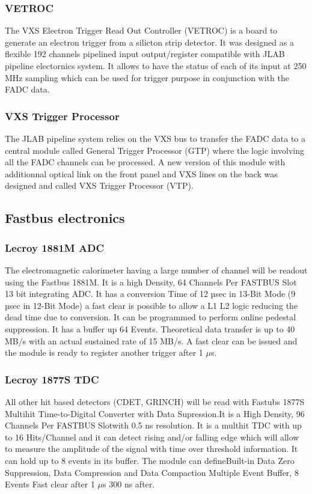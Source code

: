\documentclass{article}
\begin{document}
\subsubsection{VETROC}
The VXS Electron Trigger Read Out Controller (VETROC) is a board to generate an electron trigger from a silicton strip detector. It was designed as a flexible 192 channels pipelined input output/register compatible with JLAB pipeline electornics system. It allows to have the status of each of its input at 250 MHz sampling which can be used for trigger purpose in conjunction with the FADC data.

\subsubsection{VXS Trigger Processor}
The JLAB pipeline system relies on the VXS bus to transfer the FADC data to a central module called General Trigger Processor (GTP) where the logic involving all the FADC channels can be processed. A new version of this module with additionnal optical link on the front panel and VXS lines on the back was designed and called VXS Trigger Processor (VTP).


\subsection{Fastbus electronics}
\subsubsection{Lecroy 1881M ADC}
The electromagnetic calorimeter having a large number of channel will be readout using the Fastbus 1881M.
It is a high Density, 64 Channels Per FASTBUS Slot 13 bit integrating ADC. It has a conversion Time of 12 µsec in 13-Bit Mode (9 µsec in 12-Bit Mode) a fast clear is possible to allow a L1 L2 logic reducing the dead time due to conversion. It can be programmed to perform online pedestal suppression. It has a buffer up 64 Events.
Theoretical data transfer is up to 40 MB/s with an actual sustained rate of 15 MB/s.
A fast clear can be issued and the module is ready to register another trigger after 1 $\mu$s.

\subsubsection{Lecroy 1877S TDC}
All other hit based detectors (CDET, GRINCH) will be read with Fastubs 1877S Multihit Time-to-Digital Converter with Data Supression.It is a  High Density, 96 Channels Per FASTBUS Slotwith 0.5 ns resolution.
It is a multhit TDC with up to 16 Hits/Channel and it can detect rising and/or falling edge which will allow to measure the amplitude of the signal with time over threshold information. It can hold up to 8 events in its buffer. The module can defineBuilt-in Data Zero Suppression, Data Compression and Data Compaction
    Multiple Event Buffer, 8 Events
    Fast clear after 1 $\mu$s 300 ns after.
\end{document}
